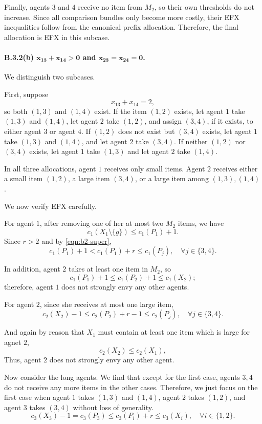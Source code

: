 \documentclass{article}
\theoremstyle{definition}
\begin{document}
Finally, agents $3$ and $4$ receive no item from $M_2$, so their own
thresholds do not increase.  Since all comparison bundles only become more
costly, their EFX inequalities follow from the canonical prefix allocation.
Therefore, the final allocation is EFX in this subcase.



\paragraph{B.3.2(b) $\boldsymbol{x_{13}+x_{14}>0}$ and $\boldsymbol{x_{23}=x_{24}=0}$.}

We distinguish two subcases.

First, suppose
\[
    x_{13}+x_{14}=2,
\]
so both $(1,3)$ and $(1,4)$ exist.  If the item $(1,2)$ exists, let agent $1$
take $(1,3)$ and $(1,4)$, let agent $2$ take $(1,2)$, and assign $(3,4)$, if
it exists, to either agent $3$ or agent $4$.  If $(1,2)$ does not exist but
$(3,4)$ exists, let agent $1$ take $(1,3)$ and $(1,4)$, and let agent $2$
take $(3,4)$.  If neither $(1,2)$ nor $(3,4)$ exists, let agent $1$ take
$(1,3)$ and let agent $2$ take $(1,4)$.

In all three allocations, agent $1$ receives only small items.  Agent $2$
receives either a small item $(1,2)$, a large item $(3,4)$, or a large item
among $(1,3),(1,4)$.

We now verify EFX carefully.

For agent $1$, after removing one of her at most two $M_2$ items, we have
\[
c_1(X_1 \setminus \{g\}) \le c_1(P_1) + 1.
\]
Since $r>2$ and by \eqref{eqn:b2-super},
\[
c_1(P_1)+1 < c_1(P_1)+r \le c_1(P_j), \quad \forall j\in\{3,4\}.
\]

In addition, agent $2$ takes at least one item in $M_2$, so 
\[
c_1(P_1)+1 \le c_1(P_2)+1 \le c_1(X_2);
\]
therefore, agent $1$ does not strongly envy any other agents.

For agent $2$, since she receives at most one large item,
\[
c_2(X_2) - 1 \le c_2(P_2) + r - 1 \le c_2(P_j),\quad \forall j\in\{3,4\}.
\]

And again by reason that $X_1$ must contain at least one item which is large for agnet $2$,
\[
c_2(X_2) \le c_2(X_1),
\]
Thus, agent $2$ does not strongly envy any other agent.

Now consider the long agents. We find that except for the first case, agents $3,4$ do not receive any more items in the other cases. Therefore, we just focus on the first case when agent $1$ takes $(1,3)$ and $(1,4)$, agent $2$ takes $(1,2)$, and agent $3$ takes $(3,4)$ without loss of generality. 
\[
c_3(X_3) - 1 = c_3(P_3) \le c_3(P_i) + r \le c_3(X_i), \quad \forall i\in\{1,2\}.
\]
\end{document}
